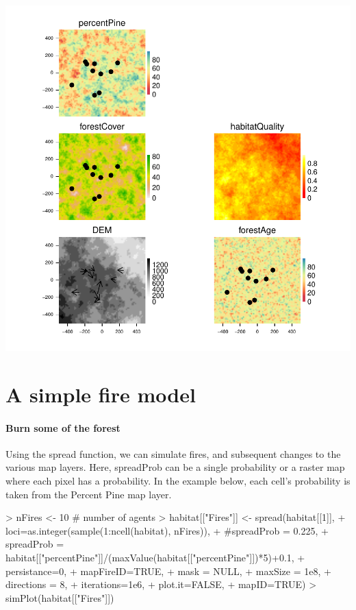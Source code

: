 \documentclass{article}
\begin{document}
\includegraphics{introduction-mobile-point-agent}

\section{A simple fire model}
\paragraph{Burn some of the forest}
Using the spread function, we can simulate fires, and subsequent changes to the various map layers. Here, spreadProb can be a single probability or a raster map where each pixel has a probability. In the example below, each cell's probability is taken from the Percent Pine map layer.


\begin{Schunk}
\begin{Sinput}
> nFires <- 10 # number of agents
> habitat[["Fires"]] <- spread(habitat[[1]],
+                              loci=as.integer(sample(1:ncell(habitat), nFires)),
+                              #spreadProb = 0.225,
+                              spreadProb = habitat[["percentPine"]]/(maxValue(habitat[["percentPine"]])*5)+0.1,
+                              persistance=0,
+                              mapFireID=TRUE,
+                              mask = NULL,
+                              maxSize = 1e8,
+                              directions = 8,
+                              iterations=1e6,
+                              plot.it=FALSE,
+                              mapID=TRUE)
> simPlot(habitat[["Fires"]])
\end{Sinput}
\end{Schunk}
\end{document}
